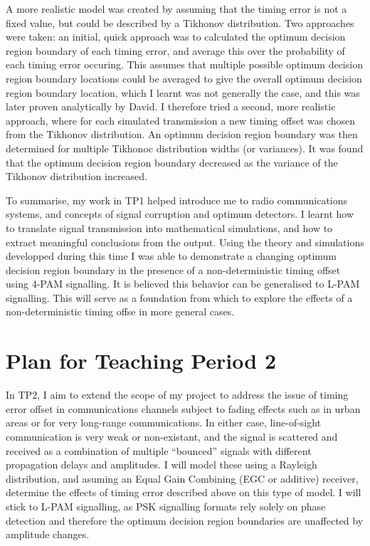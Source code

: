 A more realistic model was created by assuming that the timing error is
not a fixed value, but could be described by a Tikhonov distribution.
Two approaches were taken: an initial, quick approach was to calculated
the optimum decision region boundary of each timing error, and average
this over the probability of each timing error occuring. This assumes
that multiple possible optimum decision region boundary locations could
be averaged to give the overall optimum decision region boundary
location, which I learnt was not generally the case, and this was later
proven analytically by David. I therefore tried a second, more realistic
approach, where for each simulated transmission a new timing offset was
chosen from the Tikhonov distribution. An optimum decision region
boundary was then determined for multiple Tikhonoc distribution widths
(or variances). It was found that the optimum decision region boundary
decreased as the variance of the Tikhonov distribution increased.

To summarise, my work in TP1 helped introduce me to radio communications
systems, and concepts of signal corruption and optimum detectors. I
learnt how to translate signal transmission into mathematical
simulations, and how to extract meaningful conclusions from the output.
Using the theory and simulations developped during this time I was able
to demonstrate a changing optimum decision region boundary in the
presence of a non-deterministic timing offset using 4-PAM signalling. It
is believed this behavior can be generalised to L-PAM signalling. This
will serve as a foundation from which to explore the effects of a
non-deterministic timing offse in more general cases.

\section{Plan for Teaching Period 2}

In TP2, I aim to extend the scope of my project to address the issue of
timing error offset in communications channels subject to fading effects
such as in urban areas or for very long-range communications. In either
case, line-of-sight communication is very weak or non-existant, and the
signal is scattered and received as a combination of multiple
``bounced'' signals with different propagation delays and amplitudes. I
will model these using a Rayleigh distribution, and asuming an Equal
Gain Combining (EGC or additive) receiver, determine the effects of
timing error described above on this type of model. I will stick to
L-PAM signalling, as PSK signalling formats rely solely on phase
detection and therefore the optimum decision region boundaries are
unaffected by amplitude changes.

